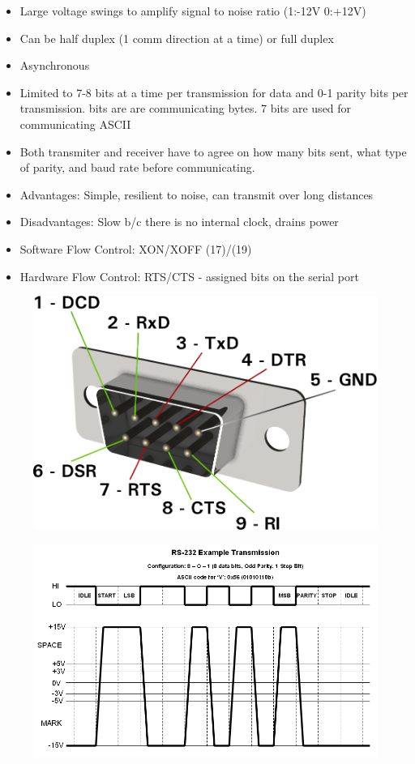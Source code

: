 \documentclass{hw}
\begin{document}
\begin{itemize}
  \item Large voltage swings to amplify signal to noise ratio (1:-12V 0:+12V)
  \item Can be half duplex (1 comm direction at a time) or full duplex
  \item Asynchronous 
  \item Limited to 7-8 bits at a time per transmission for data and 0-1 parity 
    bits per transmission.
     bits are are communicating bytes. 7 bits are used for communicating
    ASCII
  \item Both transmiter and receiver have to agree on how many bits sent, what
    type of parity, and baud rate before communicating.
  \item Advantages: Simple, resilient to noise, can transmit over long distances
  \item Disadvantages: Slow b/c there is no internal clock, drains power
  \item Software Flow Control: XON/XOFF (17)/(19)
  \item Hardware Flow Control: RTS/CTS - assigned bits on the serial port
\end{itemize}
\begin{figure}[H]
  \centering
  \includegraphics[scale=.25]{img/rs2}
\end{figure}
\begin{figure}[H]
  \centering
  \includegraphics[scale=.4]{img/rs3}
\end{figure}
\end{document}

